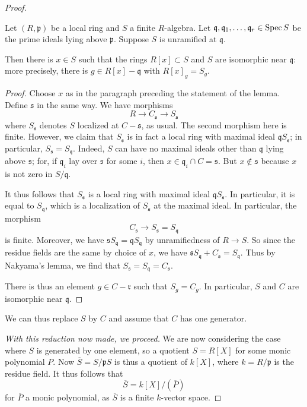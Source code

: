 \begin{proof}
\begin{lemma}
Let $(R, \mathfrak{p})$ be a local ring and $S$ a finite $R$-algebra. Let
$\mathfrak{q}, \mathfrak{q}_1, \dots, \mathfrak{q}_r \in \operatorname{Spec} S$ be the prime ideals
lying above $\mathfrak{p}$. Suppose $S$ is unramified at $\mathfrak{q}$.

Then there is $x \in S$ such that the rings $R[x] \subset S$ and $S$ are
isomorphic near $\mathfrak{q}$: more precisely, there is $g \in R[x] -
\mathfrak{q}$ with $R[x]_g = S_g$.
\end{lemma} 
\begin{proof} Choose $x$ as in the paragraph preceding the statement of
the lemma.
Define $\mathfrak{s}$ in the same way.
We have  morphisms
\[ R \to C_{\mathfrak{s}} \to S_{\mathfrak{s}}  \]
where $S_{\mathfrak{s}}$ denotes $S$ localized at $C-\mathfrak{s}$, as usual.
The second morphism here is finite. 
However, we claim that $S_{\mathfrak{s}}$ is in fact a local ring with maximal
ideal $\mathfrak{q} S_{\mathfrak{s}}$; in particular, $S_{\mathfrak{s}} =
S_{\mathfrak{q}}$.
Indeed, $S$ can have no maximal ideals other than
$\mathfrak{q}$ lying above $\mathfrak{s}$; for, 
if $\mathfrak{q}_i$ lay over $\mathfrak{s}$ for some $i$, then $x \in
\mathfrak{q}_i \cap C = \mathfrak{s}$. But $x \notin\mathfrak{s}$ because $x$
is not zero in $S/\mathfrak{q}$.


It thus follows that $S_{\mathfrak{s}}$ is a local ring with maximal ideal
$\mathfrak{q}S_{\mathfrak{s}}$. In particular, it is
equal to $S_{\mathfrak{q}}$, which is a localization of
$S_{\mathfrak{s}}$ at the maximal ideal.
In particular, the morphism 
\[ C_{\mathfrak{s}} \to S_{\mathfrak{s}} = S_{\mathfrak{q}}  \]
is finite. Moreover, we have $\mathfrak{s} S_{\mathfrak{q}} =
\mathfrak{q}S_{\mathfrak{q}}$ by unramifiedness of $R \to S$.
So since the residue fields are the same by choice of $x$, we have
$\mathfrak{s}S_{\mathfrak{q}} + C_{\mathfrak{s}} = S_{\mathfrak{q}}$.
Thus by Nakyama's lemma, we find that $S_{\mathfrak{s}} = S_{\mathfrak{q}} = C_{\mathfrak{s}}$.


There is thus an element $g \in C - \mathfrak{r}$ such that $S_g = C_g$.
In particular, $S$ and $C$ are isomorphic near $\mathfrak{q}$.
\end{proof} 

We can thus replace $S$ by $C$ and assume that $C$ has one generator. 

\emph{With this reduction now made, we proceed.} We are now considering the
case where $S$ is generated by one element, so a quotient $S = R[X]$ for
some monic polynomial $P$. 
Now $\overline{S} = S/\mathfrak{p}S$ is thus a quotient of $k[X]$, where $k =
R/\mathfrak{p}$ is the residue field.
It thus follows that
\[ \overline{S} = k[X]/(\overline{P})  \]
for $\overline{P}$ a monic polynomial, as $\overline{S}$ is a finite
$k$-vector space. 


\end{proof}
